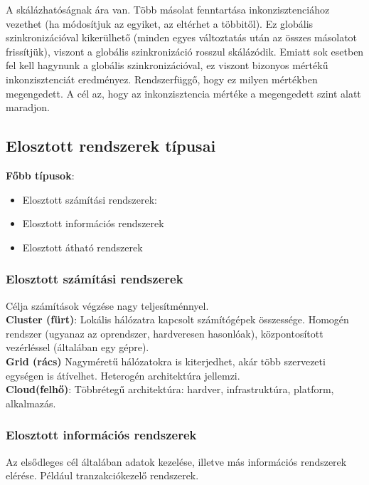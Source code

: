 \documentclass[12pt]{article}
\begin{document}
    \noindent A skálázhatóságnak ára van. Több másolat fenntartása inkonzisztenciához vezethet (ha módosítjuk az egyiket, az eltérhet a többitől).
	Ez globális szinkronizációval kikerülhető (minden egyes változtatás után az összes másolatot frissítjük), viszont a globális
	szinkronizáció rosszul skálázódik. Emiatt sok esetben fel kell hagynunk a globális szinkronizációval, ez viszont bizonyos
	mértékű inkonzisztenciát eredményez. Rendszerfüggő, hogy ez milyen mértékben megengedett. A cél az, hogy az inkonzisztencia mértéke
	a megengedett szint alatt maradjon.
	
	\subsection{Elosztott rendszerek típusai}
	
	\noindent \textbf{Főbb típusok}:
	\begin{itemize}
		\item	Elosztott számítási rendszerek:
		\item	Elosztott információs rendszerek
		\item 	Elosztott átható rendszerek
	\end{itemize}
	
	\subsubsection{Elosztott számítási rendszerek}
	
	Célja számítások végzése nagy teljesítménnyel.\\
	
	\noindent \textbf{Cluster (fürt)}: Lokális hálózatra kapcsolt számítógépek összessége. Homogén rendszer (ugyanaz az oprendszer,
	hardveresen hasonlóak), központosított vezérléssel (általában egy gépre).\\
	
	\noindent \textbf{Grid (rács)} Nagyméretű hálózatokra is kiterjedhet, akár több szervezeti egységen is átívelhet. Heterogén
	architektúra jellemzi.\\
	
	\noindent \textbf{Cloud(felhő)}: Többrétegű architektúra: hardver, infrastruktúra, platform, alkalmazás.
	
	\subsubsection{Elosztott információs rendszerek}
	
	Az elsődleges cél általában adatok kezelése, illetve más információs rendszerek elérése. Például tranzakciókezelő rendszerek.\\
	
\end{document}

